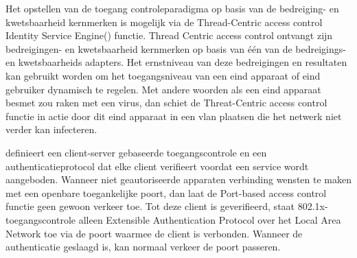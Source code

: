 \newline
Het opstellen van de toegang controleparadigma op basis van de bedreiging- en kwetsbaarheid kernmerken is mogelijk via de Thread-Centric access control Identity Service Engine(\cite{TCNAC}) functie. Thread Centric access control ontvangt zijn bedreigingen- en kwetsbaarheid kernmerken op basis van één van de bedreigings- en kwetsbaarheids adapters. Het ernstniveau van deze bedreigingen en resultaten kan gebruikt worden om het toegangsniveau van een eind apparaat of eind gebruiker dynamisch te regelen.
\newline
\newline
Met andere woorden als een eind apparaat besmet zou raken met een virus, dan schiet de Threat-Centric access control functie in actie door dit eind apparaat in een vlan plaatsen die het netwerk niet verder kan infecteren. 

\newline
\cite{PBAC} definieert een client-server gebaseerde toegangscontrole en een authenticatieprotocol dat elke client verifieert voordat een service wordt aangeboden. Wanneer niet geautoriseerde apparaten verbinding wensten te maken met een openbare toegankelijke poort, dan laat de Port-based access control functie geen gewoon verkeer toe.
\newline
\newline
Tot deze client is geverifieerd, staat 802.1x-toegangscontrole alleen Extensible Authentication Protocol over het Local Area Network toe via de poort waarmee de client is verbonden. Wanneer de authenticatie geslaagd is, kan normaal verkeer de poort passeren.

